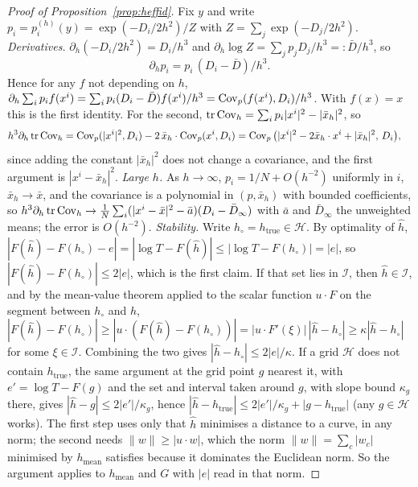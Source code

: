 \documentclass{article}
\theoremstyle{plain}
\theoremstyle{remark}
\begin{document}
\begin{proof}[Proof of Proposition~\ref{prop:heffid}]
Fix $y$ and write $p_i=p_i^{(h)}(y)=\exp(-D_i/2h^2)/Z$ with $Z=\sum_j\exp(-D_j/2h^2)$.
\emph{Derivatives.} $\partial_h(-D_i/2h^2)=D_i/h^3$ and
$\partial_h\log Z=\sum_jp_jD_j/h^3=:\bar D/h^3$, so
\begin{equation}
\partial_hp_i=p_i\,(D_i-\bar D)/h^3 .
\end{equation}
Hence for any $f$ not depending on $h$,
$\partial_h\sum_ip_if(x^i)=\sum_ip_i(D_i-\bar D)f(x^i)/h^3=\operatorname{Cov}_p(f(x^i),D_i)/h^3$. With
$f(x)=x$ this is the first identity. For the second,
$\operatorname{tr}\operatorname{Cov}_h=\sum_ip_i|x^i|^2-|\bar x_h|^2$, so
\begin{align*}
h^3\partial_h\operatorname{tr}\operatorname{Cov}_h
&=\operatorname{Cov}_p(|x^i|^2,D_i)-2\,\bar x_h\cdot\operatorname{Cov}_p(x^i,D_i)
=\operatorname{Cov}_p\big(|x^i|^2-2\bar x_h\cdot x^i+|\bar x_h|^2,\,D_i\big),
\end{align*}
since adding the constant $|\bar x_h|^2$ does not change a covariance, and the first
argument is $|x^i-\bar x_h|^2$.
\emph{Large $h$.} As $h\to\infty$, $p_i=1/N+O(h^{-2})$ uniformly in $i$, $\bar x_h\to\bar x$,
and the covariance is a polynomial in $(p,\bar x_h)$ with bounded coefficients, so
$h^3\partial_h\operatorname{tr}\operatorname{Cov}_h\to\frac1N\sum_i(|x^i-\bar x|^2-\bar a)(D_i-\bar D_\infty)$ with $\bar a$
and $\bar D_\infty$ the unweighted means; the error is $O(h^{-2})$.
\emph{Stability.} Write $h_\circ=h_{\mathrm{true}}\in\mathcal H$. By optimality of $\hat h$,
$|F(\hat h)-F(h_\circ)-e|=|\log T-F(\hat h)|\le|\log T-F(h_\circ)|=|e|$, so
$|F(\hat h)-F(h_\circ)|\le2|e|$, which is the first claim. If that set lies in
$\mathcal I$, then $\hat h\in\mathcal I$, and by the mean-value theorem applied to
the scalar function $u\cdot F$ on the segment between $h_\circ$ and $\hat h$,
$|F(\hat h)-F(h_\circ)|\ge|u\cdot(F(\hat h)-F(h_\circ))|=|u\cdot F'(\xi)|\,|\hat h-h_\circ|
\ge\kappa|\hat h-h_\circ|$ for some $\xi\in\mathcal I$. Combining the two gives
$|\hat h-h_\circ|\le2|e|/\kappa$. If a grid $\mathcal H$ does not contain
$h_{\mathrm{true}}$, the same argument at the grid point $g$ nearest it, with
$e'=\log T-F(g)$ and the set and interval taken around $g$, with slope bound $\kappa_g$
there, gives $|\hat h-g|\le2|e'|/\kappa_g$, hence
$|\hat h-h_{\mathrm{true}}|\le2|e'|/\kappa_g+|g-h_{\mathrm{true}}|$ (any $g\in\mathcal H$ works).
The first step uses only that $\hat h$ minimises a distance to a curve, in any norm; the
second needs $\|w\|\ge|u\cdot w|$, which the norm $\|w\|=\sum_c|w_c|$ minimised by
$h_{\mathrm{mean}}$ satisfies because it dominates the Euclidean norm. So the argument
applies to $h_{\mathrm{mean}}$ and $G$ with $|e|$ read in that norm.
\end{proof}
\end{document}
